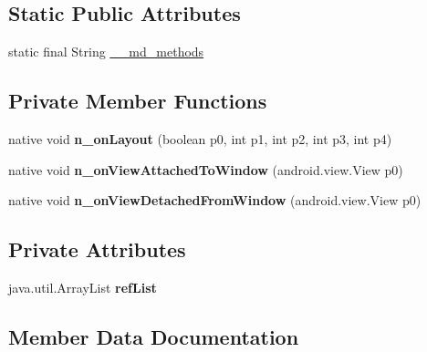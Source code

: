 \subsection*{Static Public Attributes}
\begin{DoxyCompactItemize}
\item 
static final String \hyperlink{classmd5270abb39e60627f0f200893b490a1ade_1_1ButtonRenderer_aa6804b17a4e0acb62c327822a4dea5b2}{\+\_\+\+\_\+md\+\_\+methods}
\end{DoxyCompactItemize}
\subsection*{Private Member Functions}
\begin{DoxyCompactItemize}
\item 
\mbox{\label{classmd5270abb39e60627f0f200893b490a1ade_1_1ButtonRenderer_afd8f463e834eac0c0aa3ec80c6a310bc}} 
native void {\bfseries n\+\_\+on\+Layout} (boolean p0, int p1, int p2, int p3, int p4)
\item 
\mbox{\label{classmd5270abb39e60627f0f200893b490a1ade_1_1ButtonRenderer_aaac07254eddcd87b062e694ba6db6bb0}} 
native void {\bfseries n\+\_\+on\+View\+Attached\+To\+Window} (android.\+view.\+View p0)
\item 
\mbox{\label{classmd5270abb39e60627f0f200893b490a1ade_1_1ButtonRenderer_a8f2983bfd636ed8d8a82d46e9900e463}} 
native void {\bfseries n\+\_\+on\+View\+Detached\+From\+Window} (android.\+view.\+View p0)
\end{DoxyCompactItemize}
\subsection*{Private Attributes}
\begin{DoxyCompactItemize}
\item 
\mbox{\label{classmd5270abb39e60627f0f200893b490a1ade_1_1ButtonRenderer_a2a4a0404703b01e8d3b5f88cd8313a90}} 
java.\+util.\+Array\+List {\bfseries ref\+List}
\end{DoxyCompactItemize}


\subsection{Member Data Documentation}
\mbox{\label{classmd5270abb39e60627f0f200893b490a1ade_1_1ButtonRenderer_aa6804b17a4e0acb62c327822a4dea5b2}} 
